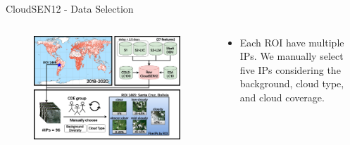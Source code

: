 \begin{frame}{CloudSEN12 - Data Selection}
	\begin{columns}
		\begin{column}{0.7\textwidth}
			\begin{figure}
				\includegraphics[width=1\textwidth]{images/methodology02.png}
				\label{fig:introfig02}
			\end{figure}
		\end{column}
		\begin{column}{0.3\textwidth}
			\begin{itemize}
				\item Each ROI have multiple IPs. We manually select five IPs considering the background, cloud type, and cloud coverage.
			\end{itemize}
		\end{column}
	\end{columns}
\end{frame}


